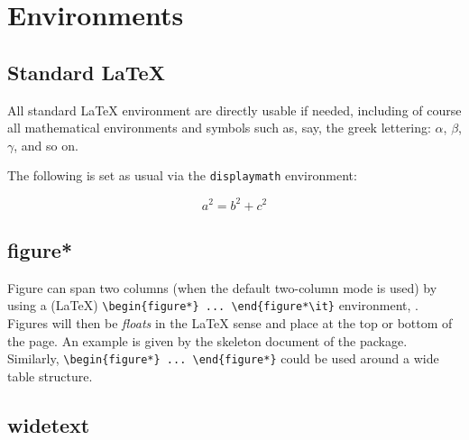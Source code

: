 \documentclass[letterpaper,9pt,twocolumn,twoside,]{pinp}
\begin{document}
\begin{Shaded}
\begin{Highlighting}[]
\NormalTok{):}
    
   
\end{Highlighting}
\end{Shaded}

\hypertarget{environments}{%
\section{Environments}\label{environments}}

\hypertarget{standard-latex}{%
\subsection{Standard LaTeX}\label{standard-latex}}

All standard LaTeX environment are directly usable if needed, including
of course all mathematical environments and symbols such as, say, the
greek lettering: \(\alpha\), \(\beta\), \(\gamma\), and so on.

The following is set as usual via the \texttt{displaymath} environment:

\begin{displaymath}
    a^2 = b^2 + c^2
\end{displaymath}

\hypertarget{figure}{%
\subsection{figure*}\label{figure}}

Figure can span two columns (when the default two-column mode is used)
by using a (LaTeX)
\texttt{\textbackslash{}begin\{figure*\}\ ...\ \textbackslash{}end\{figure*\textbackslash{}it\}}
environment, . Figures will then be \emph{floats} in the LaTeX sense and
place at the top or bottom of the page. An example is given by the
skeleton document of the package. Similarly,
\texttt{\textbackslash{}begin\{figure*\}\ ...\ \textbackslash{}end\{figure*\}}
could be used around a wide table structure.

\hypertarget{widetext}{%
\subsection{widetext}\label{widetext}}
\end{document}
